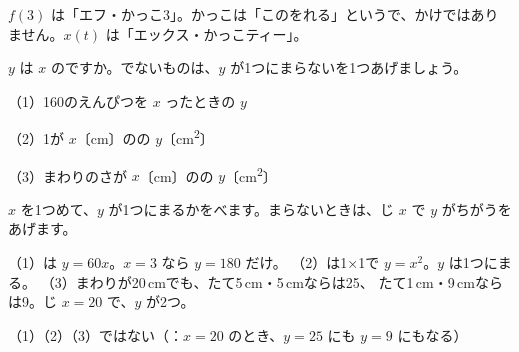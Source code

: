 {\begin{minipage}[c]{52mm}\small $f(3)$ は「エフ・かっこ3」。かっこは「このをれる」というで、かけではありません。$x(t)$ は「エックス・かっこティー」。\end{minipage}}





\begin{reidai}[\R{関数}{かん|すう}かどうかを\R{見分}{み|わ}ける]
$y$ は $x$ のですか。でないものは、$y$ が1つにまらないを1つあげましょう。\par
（1）160のえんぴつを $x$ ったときの $y$ \par
（2）1が $x$〔cm〕のの $y$〔\unit{cm^2}〕\par
（3）まわりのさが $x$〔cm〕のの $y$〔\unit{cm^2}〕\par
\kangaekata $x$ を1つめて、$y$ が1つにまるかをべます。まらないときは、じ $x$ で $y$ がちがうをあげます。\par
\bkthrdSi（1）\nobreak {}は $y=60x$。$x=3$ なら $y=180$ だけ。
\bkthrdI（2）\nobreak {}は1×1で $y=x^2$。$y$ は1つにまる。
\bkthrdI（3）\nobreak まわりが20\,cmでも、たて5\,cm・5\,cmならは25、
\bkthrdJ たて1\,cm・9\,cmならは9。じ $x=20$ で、$y$ が2つ。\par
\bkthrdK（1）\nobreak {}\quad（2）\nobreak {}\quad（3）\nobreak {}ではない（：$x=20$ のとき、$y=25$ にも $y=9$ にもなる）
\end{reidai}

